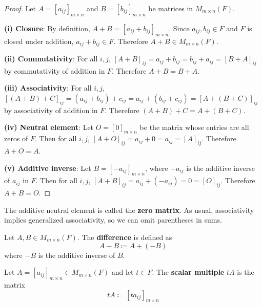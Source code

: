 \begin{proof}
    Let $A = [a_{ij}]_{m \times n}$ and $B = [b_{ij}]_{m \times n}$ be matrices in $M_{m \times n}(F)$.
    
    \textbf{(i) Closure}: By definition, $A + B = [a_{ij} + b_{ij}]_{m \times n}$. Since $a_{ij}, b_{ij} \in F$ and $F$ is closed under addition, $a_{ij} + b_{ij} \in F$. Therefore $A + B \in M_{m \times n}(F)$.
    
    \textbf{(ii) Commutativity}: For all $i,j$, $[A + B]_{ij} = a_{ij} + b_{ij} = b_{ij} + a_{ij} = [B + A]_{ij}$ by commutativity of addition in $F$. Therefore $A + B = B + A$.
    
    \textbf{(iii) Associativity}: For all $i,j$, $[(A + B) + C]_{ij} = (a_{ij} + b_{ij}) + c_{ij} = a_{ij} + (b_{ij} + c_{ij}) = [A + (B + C)]_{ij}$ by associativity of addition in $F$. Therefore $(A + B) + C = A + (B + C)$.
    
    \textbf{(iv) Neutral element}: Let $O = [0]_{m \times n}$ be the matrix whose entries are all zeros of $F$. Then for all $i,j$, $[A + O]_{ij} = a_{ij} + 0 = a_{ij} = [A]_{ij}$. Therefore $A + O = A$.
    
    \textbf{(v) Additive inverse}: Let $B = [-a_{ij}]_{m \times n}$, where $-a_{ij}$ is the additive inverse of $a_{ij}$ in $F$. Then for all $i,j$, $[A + B]_{ij} = a_{ij} + (-a_{ij}) = 0 = [O]_{ij}$. Therefore $A + B = O$.
\end{proof}

\begin{note}
    The additive neutral element is called the \textbf{zero matrix}. As usual, associativity implies generalized associativity, so we can omit parentheses in sums.
\end{note}

\begin{definition}\label{def:matrix-subtraction}
    Let $A, B \in M_{m \times n}(F)$. The \textbf{difference} is defined as
    \[
    A - B \coloneqq A + (-B)
    \]
    where $-B$ is the additive inverse of $B$.
\end{definition}

\begin{definition}\label{def:scalar-multiplication}
    Let $A = [a_{ij}]_{m \times n} \in M_{m \times n}(F)$ and let $t \in F$. The \textbf{scalar multiple} $tA$ is the matrix
    \[
    tA \coloneqq [ta_{ij}]_{m \times n}
    \]
\end{definition}

